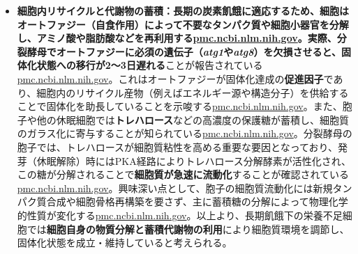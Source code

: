 \begin{itemize}
    \item \textbf{細胞内リサイクルと代謝物の蓄積：\textbf{長期の炭素飢餓に適応するため、細胞は}オートファジー（自食作用）\textbf{によって不要なタンパク質や細胞小器官を分解し、アミノ酸や脂肪酸などを再利用する\href{https://pmc.ncbi.nlm.nih.gov/articles/PMC6857596/\#:~:text=autophagy,atg8}{pmc.ncbi.nlm.nih.gov}。実際、分裂酵母でオートファジーに必須の遺伝子（\textit{atg1}や\textit{atg8}）を欠損させると、固体化状態への移行が}2〜3日遅れる}ことが報告されている\href{https://pmc.ncbi.nlm.nih.gov/articles/PMC6857596/\#:~:text=\%CE\%94,delay\%20compared\%20with\%20wild\%20type}{pmc.ncbi.nlm.nih.gov}。これはオートファジーが固体化達成の\textbf{促進因子}であり、細胞内のリサイクル産物（例えばエネルギー源や構造分子）を供給することで固体化を助長していることを示唆する\href{https://pmc.ncbi.nlm.nih.gov/articles/PMC6857596/\#:~:text=this\%20state,mediate\%20the\%20CF\%20state\%20in}{pmc.ncbi.nlm.nih.gov}。また、胞子や他の休眠細胞では\textbf{トレハロース}などの高濃度の保護糖が蓄積し、細胞質のガラス化に寄与することが知られている\href{https://pmc.ncbi.nlm.nih.gov/articles/PMC6857596/\#:~:text=et\%20al,2009}{pmc.ncbi.nlm.nih.gov}。分裂酵母の胞子では、トレハロースが細胞質粘性を高める重要な要因となっており、発芽（休眠解除）時にはPKA経路によりトレハロース分解酵素が活性化され、この糖が分解されることで\textbf{細胞質が急速に流動化}することが確認されている\href{https://pmc.ncbi.nlm.nih.gov/articles/PMC11214080/\#:~:text=cytoplasmic\%20properties,of\%20diffusion\%20coefficients\%20with\%20tracer}{pmc.ncbi.nlm.nih.gov}。興味深い点として、胞子の細胞質流動化には新規タンパク質合成や細胞骨格再構築を要さず、主に蓄積糖の分解によって物理化学的性質が変化する\href{https://pmc.ncbi.nlm.nih.gov/articles/PMC11214080/\#:~:text=cytoplasmic\%20properties,of\%20diffusion\%20coefficients\%20with\%20tracer}{pmc.ncbi.nlm.nih.gov}。以上より、長期飢餓下の栄養不足細胞では\textbf{細胞自身の物質分解と蓄積代謝物の利用}により細胞質環境を調節し、固体化状態を成立・維持していると考えられる。
\end{itemize}
